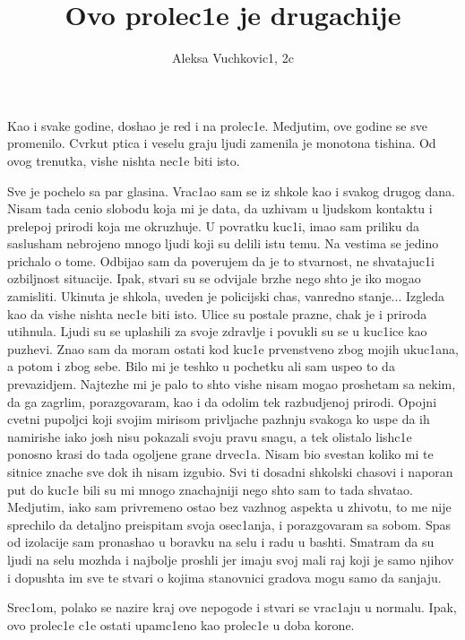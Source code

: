 \documentclass[11pt]{article}
\title{\bf{Ovo prolec1e je drugachije}}
\author{\Large Aleksa Vuchkovic1, 2c}
\date{}
\begin{document}
\maketitle
\Large
Kao i svake godine, doshao je red i na prolec1e. Medjutim, ove godine se sve promenilo. Cvrkut ptica i veselu graju ljudi zamenila je monotona tishina. Od ovog trenutka, vishe nishta nec1e biti isto.

Sve je pochelo sa par glasina. Vrac1ao sam se iz shkole kao i svakog drugog dana. Nisam tada cenio slobodu koja mi je data, da uzhivam u ljudskom kontaktu i prelepoj prirodi koja me okruzhuje. U povratku kuc1i, imao sam priliku da saslusham nebrojeno mnogo ljudi koji su delili istu temu. Na vestima se jedino prichalo o tome. Odbijao sam da poverujem da je to stvarnost, ne s${}$hvatajuc1i ozbiljnost situacije. Ipak, stvari su se odvijale brzhe nego shto je iko mogao zamisliti. Ukinuta je shkola, uveden je policijski chas, vanredno stanje... Izgleda kao da vishe nishta nec1e biti isto. Ulice su postale prazne, chak je i priroda utihnula. Ljudi su se uplashili za svoje zdravlje i povukli su se u kuc1ice kao puzhevi. Znao sam da moram ostati kod kuc1e prvenstveno zbog mojih ukuc1ana, a potom i zbog sebe. Bilo mi je teshko u pochetku ali sam uspeo to da prevazidjem. Najtezhe mi je palo to shto vishe nisam mogao proshetam sa nekim, da ga zagrlim, porazgovaram, kao i da odolim tek razbudjenoj prirodi. Opojni cvetni pupoljci koji svojim mirisom privljache pazhnju svakoga ko uspe da ih namirishe iako josh nisu pokazali svoju pravu snagu, a tek olistalo lish${}$c1e ponosno krasi do tada ogoljene grane drvec1a. Nisam bio svestan koliko mi te sitnice znache sve dok ih nisam izgubio. Svi ti dosadni shkolski chasovi i naporan put do kuc1e bili su mi mnogo znachajniji nego shto sam to tada s${}$hvatao. Medjutim, iako sam privremeno ostao bez vazhnog aspekta u zhivotu, to me nije sprechilo da detaljno preispitam svoja osec1anja, i porazgovaram sa sobom. Spas od izolacije sam pronashao u boravku na selu i radu u bashti. Smatram da su ljudi na selu mozhda i najbolje proshli jer imaju svoj mali raj koji je samo njihov i dopushta im sve te stvari o kojima stanovnici gradova mogu samo da sanjaju.

Srec1om, polako se nazire kraj ove nepogode i stvari se vrac1aju u normalu. Ipak, ovo prolec1e c1e ostati upamc1eno kao prolec1e u doba korone.
\end{document}
